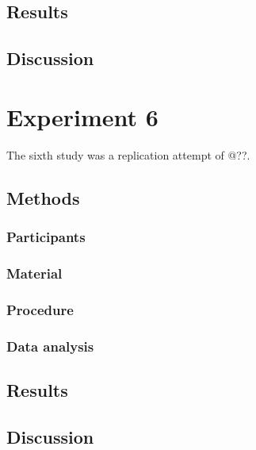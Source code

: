 \documentclass[
  english,
  man]{apa6}
\begin{document}
\hypertarget{results-4}{%
\subsection{Results}\label{results-4}}

\hypertarget{discussion-4}{%
\subsection{Discussion}\label{discussion-4}}

\hypertarget{experiment-6}{%
\section{Experiment 6}\label{experiment-6}}

The sixth study was a replication attempt of @??.

\hypertarget{methods-5}{%
\subsection{Methods}\label{methods-5}}

\hypertarget{participants-5}{%
\subsubsection{Participants}\label{participants-5}}

\hypertarget{material-4}{%
\subsubsection{Material}\label{material-4}}

\hypertarget{procedure-5}{%
\subsubsection{Procedure}\label{procedure-5}}

\hypertarget{data-analysis-4}{%
\subsubsection{Data analysis}\label{data-analysis-4}}

\hypertarget{results-5}{%
\subsection{Results}\label{results-5}}

\hypertarget{discussion-5}{%
\subsection{Discussion}\label{discussion-5}}
\end{document}

